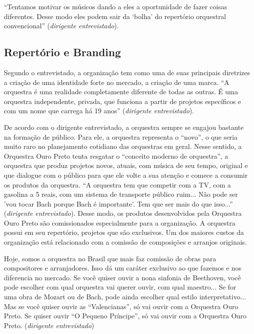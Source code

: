 \documentclass[a4paper, 12pt, openright, oneside, german, french, english, brazil]{abntex2}
\begin{document}
	``Tentamos motivar os músicos dando a eles a oportunidade de fazer coisas diferentes. Desse modo eles podem sair da `bolha' do repertório orquestral convencional'' (\textit{dirigente entrevistado}). 
	
	
	\subsection{Repertório e Branding}
	
	Segundo o entrevistado, a organização tem como uma de suas principais diretrizes a criação de uma identidade forte no mercado, a criação de uma marca. ``A orquestra é uma realidade completamente diferente de todas as outras. É uma orquestra independente, privada, que funciona a partir de projetos específicos e com um nome que carrega há 19 anos'' (\textit{dirigente entrevistado}).

	De acordo com o dirigente entrevistado, a orquestra sempre se engajou bastante na formação de público. Para ele, a orquestra representa o ``novo'', o que seria muito raro no planejamento cotidiano das orquestras em geral. Nesse sentido, a Orquestra Ouro Preto tenta resgatar o ``conceito moderno de orquestra'', a orquestra que produz projetos novos, atuais, com música de seu tempo, original e que dialogue com o público para que ele volte a sua atenção e comece a consumir os produtos da orquestra. ``A orquestra tem que competir com a TV, com a gasolina a 5 reais, com um sistema de transporte público ruim... Não pode ser 'vou tocar Bach porque Bach é importante'. Tem que ser mais do que isso...'' (\textit{dirigente entrevistado}). Desse modo, os produtos desenvolvidos pela Orquestra Ouro Preto são comissionados especialmente para a organização. A orquestra possui em seu repertório, projetos que são exclusivos. Um dos maiores custos da organização está relacionado com a comissão de composições e arranjos originais. 

	\begin{citacao}
		Hoje, somos a orquestra no Brasil que mais faz comissão de obras para compositores e arranjadores. Isso dá um caráter exclusivo ao que fazemos e nos diferencia no mercado. Se você quiser ouvir a nona sinfonia de Beethoven, você pode escolher com qual orquestra vai querer ouvir, com qual maestro...
		Se for uma obra de Mozart ou de Bach, pode ainda escolher qual estilo interpretativo... Mas se você quiser ouvir as ``Valencianas'', só vai ouvir com a Orquestra Ouro Preto. Se quiser ouvir ``O Pequeno Príncipe'', só vai ouvir com a Orquestra Ouro Preto. (\textit{dirigente entrevistado})
	\end{citacao}
\end{document}
